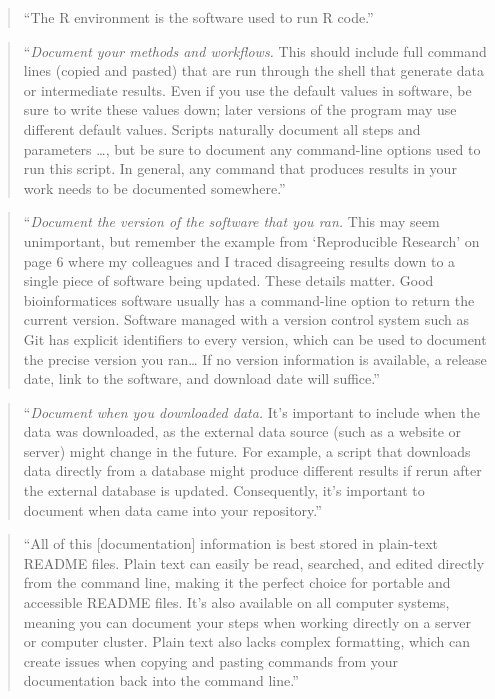 \documentclass[]{tufte-book}
\begin{document}
\begin{quote}
``The R environment is the software used to run R code.'' \citep{murrell2009introduction}
\end{quote}

\begin{quote}
``\emph{Document your methods and workflows.} This should include full command lines (copied
and pasted) that are run through the shell that generate data or intermediate results.
Even if you use the default values in software, be sure to write these values down;
later versions of the program may use different default values. Scripts naturally
document all steps and parameters \ldots, but be sure to document any command-line options
used to run this script. In general, any command that produces results in your work needs
to be documented somewhere.'' \citep{buffalo2015bioinformatics}
\end{quote}

\begin{quote}
``\emph{Document the version of the software that you ran.} This may seem unimportant, but
remember the example from `Reproducible Research' on page 6 where my colleagues and I
traced disagreeing results down to a single piece of software being updated. These
details matter. Good bioinformatices software usually has a command-line option to
return the current version. Software managed with a version control system such as
Git has explicit identifiers to every version, which can be used to document the
precise version you ran\ldots{} If no version information is available, a release date,
link to the software, and download date will suffice.'' \citep{buffalo2015bioinformatics}
\end{quote}

\begin{quote}
``\emph{Document when you downloaded data.} It's important to include when the data was downloaded,
as the external data source (such as a website or server) might change in the future. For example,
a script that downloads data directly from a database might produce different results if
rerun after the external database is updated. Consequently, it's important to document
when data came into your repository.'' \citep{buffalo2015bioinformatics}
\end{quote}

\begin{quote}
``All of this {[}documentation{]} information is best stored in plain-text README files.
Plain text can easily be read, searched, and edited directly from the command line,
making it the perfect choice for portable and accessible README files. It's also available
on all computer systems, meaning you can document your steps when working directly on
a server or computer cluster. Plain text also lacks complex formatting, which can create
issues when copying and pasting commands from your documentation back into the command
line.'' \citep{buffalo2015bioinformatics}
\end{quote}
\end{document}
